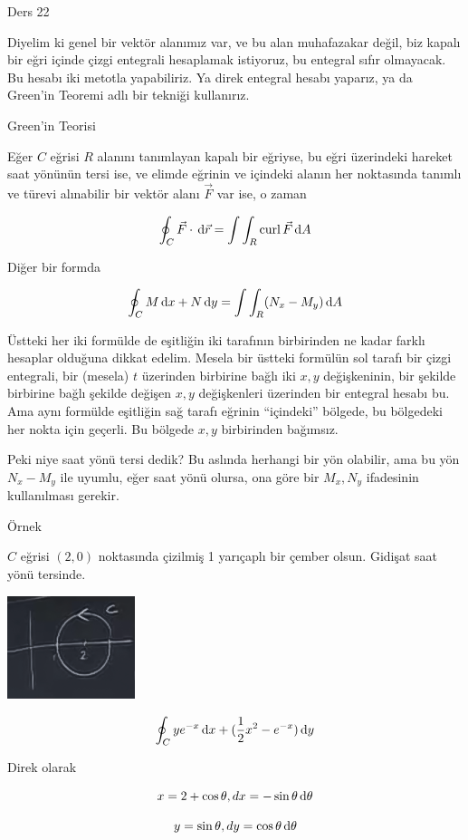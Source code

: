 \documentclass[12pt,fleqn]{article}\usepackage{../../common}
\begin{document}
Ders 22

Diyelim ki genel bir vektör alanımız var, ve bu alan muhafazakar değil, biz
kapalı bir eğri içinde çizgi entegrali hesaplamak istiyoruz, bu entegral
sıfır olmayacak. Bu hesabı iki metotla yapabiliriz. Ya direk entegral
hesabı yaparız, ya da Green'in Teoremi adlı bir tekniği kullanırız. 

Green'in Teorisi

Eğer $C$ eğrisi $R$ alanını tanımlayan kapalı bir eğriyse, bu eğri
üzerindeki hareket saat yönünün tersi ise, ve elimde eğrinin ve içindeki
alanın her noktasında tanımlı ve türevi alınabilir bir vektör alanı
$\vec{F}$ var ise, o zaman 

$$ \oint_C \vec{F} \cdot \,\mathrm{d}\vec{r} = \int \int_R \operatorname{curl} \vec{F} \,\mathrm{d} A $$

Diğer bir formda 

$$ \oint_C M \,\mathrm{d} x + N \,\mathrm{d} y = \int \int_R (N_x - M_y) \,\mathrm{d} A $$

Üstteki her iki formülde de eşitliğin iki tarafının birbirinden ne kadar
farklı hesaplar olduğuna dikkat edelim. Mesela bir üstteki formülün sol
tarafı bir çizgi entegrali, bir (mesela) $t$ üzerinden birbirine bağlı iki
$x,y$ değişkeninin, bir şekilde birbirine bağlı şekilde değişen $x,y$
değişkenleri üzerinden bir entegral hesabı bu. Ama aynı formülde eşitliğin
sağ tarafı eğrinin ``içindeki'' bölgede, bu bölgedeki her nokta için
geçerli. Bu bölgede $x,y$ birbirinden bağımsız. 

Peki niye saat yönü tersi dedik? Bu aslında herhangi bir yön olabilir, ama
bu yön $N_x-M_y$ ile uyumlu, eğer saat yönü olursa, ona göre bir $M_x,N_y$
ifadesinin kullanılması gerekir. 

Örnek

$C$ eğrisi $(2,0)$ noktasında çizilmiş 1 yarıçaplı bir çember
olsun. Gidişat saat yönü tersinde. 

\includegraphics[height=3cm]{22_1.png}

$$ \oint_C ye^{-x} \,\mathrm{d} x + (\frac{1}{2}x^2 - e^{-x}) \,\mathrm{d} y $$

Direk olarak

$$ x = 2 + \cos\theta, dx = -\sin\theta \,\mathrm{d}\theta $$

$$ y = \sin\theta, dy = \cos\theta \,\mathrm{d}\theta $$
\end{document}
